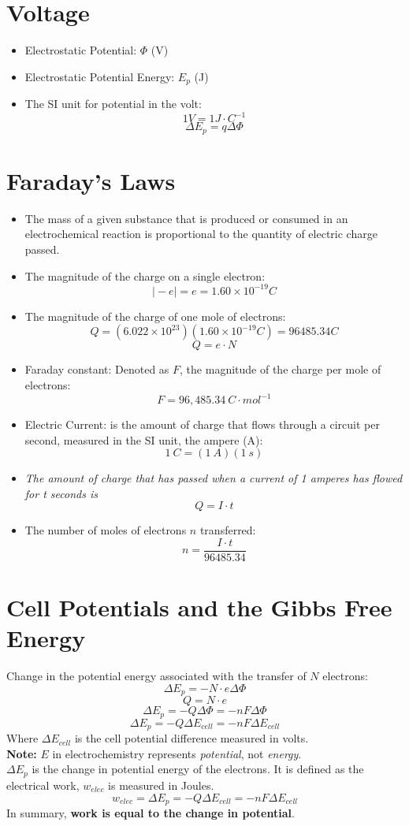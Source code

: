 \documentclass[10pt]{article}
\begin{document}
\section*{Voltage}
\begin{itemize}
    \item Electrostatic Potential: $\Phi$ (V)
    \item Electrostatic Potential Energy: $E_p$ (J)
    \item The SI unit for potential in the volt:
    \[1 V = 1 J \cdot C^{-1}\]
    \[\Delta E_p = q \Delta \Phi\]
\end{itemize}

\section*{Faraday's Laws}
\begin{itemize}
    \item The mass of a given substance that is produced or consumed in an electrochemical reaction is proportional to the quantity of electric charge passed.
    \item The magnitude of the charge on a single electron:
    \[\vert -e \vert = e = 1.60 \times 10^{-19} C\]
    \item The magnitude of the charge of one mole of electrons:
    \[Q = (6.022 \times 10^{23})(1.60 \times 10^{-19} C) = 96485.34 C\]
    \[Q = e \cdot N\]
    \item Faraday constant: Denoted as $F$, the magnitude of the charge per mole of electrons:
    \[F = 96,485.34 \:C \cdot mol^{-1}\]
    \item Electric Current: is the amount of charge that flows through a circuit per second, measured in the SI unit, the ampere (A):
    \[1\:C = (1\:A) (1\:s)\]
    \item \textit{The amount of charge that has passed when a current of 1 amperes has flowed for t seconds is}
    \[Q = I \cdot t\]
    \item The number of moles of electrons $n$ transferred:
    \[n = \frac{I \cdot t}{96485.34}\]
\end{itemize}

\section*{Cell Potentials and the Gibbs Free Energy}
Change in the potential energy associated with the transfer of $N$ electrons:
\[\Delta E_p = -N \cdot e\Delta \Phi\]
\[Q = N \cdot e\]
\[\Delta E_p = -Q\Delta \Phi = -n F \Delta \Phi\]
\[\Delta E_p = -Q\Delta E_{cell} = -nF\Delta E_{cell}\]
Where $\Delta E_{cell}$ is the cell potential difference measured in volts.\\
\textbf{Note: } $E$ in electrochemistry represents \textit{potential}, not \textit{energy}.\\
$\Delta E_p$ is the change in potential energy of the electrons.  It is defined as the electrical work, $w_{elec}$ is measured in Joules.
\[w_{elec} = \Delta E_p = -Q\Delta E_{cell} = -nF\Delta E_{cell}\]
In summary, \textbf{work is equal to the change in potential}.
\end{document}
